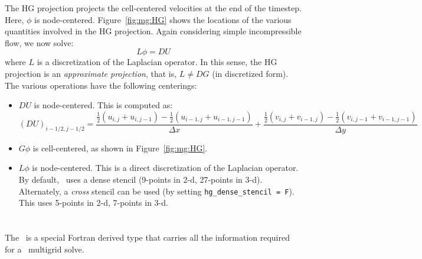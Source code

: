 The HG projection projects the cell-centered velocities at the end of
the timestep.  Here, $\phi$ is node-centered.  Figure~\ref{fig:mg:HG}
shows the locations of the various quantities involved in the HG
projection.  Again considering simple incompressible flow, we now
solve:
\begin{equation}
L \phi = D U
\end{equation}
where $L$ is a discretization of the Laplacian operator.  In this
sense, the HG projection is an {\em approximate projection}, that is,
$L \neq DG$ (in discretized form).  The various operations have the
following centerings:
\begin{itemize}

\item $DU$ is node-centered.  This is computed as:
  \begin{equation}
  (DU)_{i-1/2,j-1/2} = \frac{\frac{1}{2} (u_{i,j} + u_{i,j-1}) -
                             \frac{1}{2} (u_{i-1,j} + u_{i-1,j-1})}{\Delta x} +
                       \frac{\frac{1}{2} (v_{i,j} + v_{i-1,j}) -
                             \frac{1}{2} (v_{i,j-1} + v_{i-1,j-1})}{\Delta y} 
  \end{equation}

\item $G\phi$ is cell-centered, as shown in Figure~\ref{fig:mg:HG}.

\item $L\phi$ is node-centered.  This is a direct discretization of 
the Laplacian operator.  By default, \maestro\ uses a dense stencil
(9-points in 2-d, 27-points in 3-d).  Alternately, a {\em cross}
stencil can be used (by setting {\tt hg\_dense\_stencil = F}).  This
uses 5-points in 2-d, 7-points in 3-d.

\end{itemize}


\section{\mgtower}

The \mgtower\ is a special Fortran derived type that carries all the
information required for a \boxlib\ multigrid solve.

